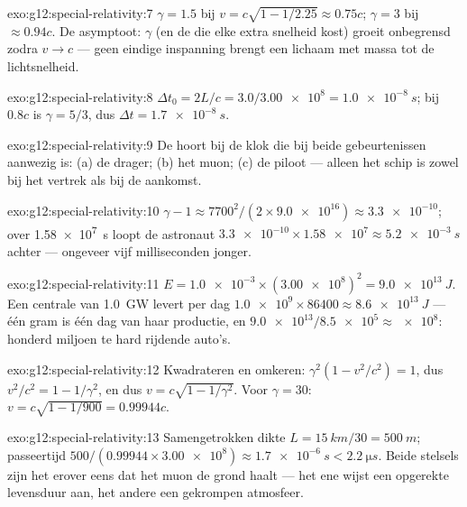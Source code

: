 \begin{solution}{exo:g12:special-relativity:7}
$\gamma = 1.5$ bij $v = c\sqrt{1 - 1/2.25} \approx 0.75c$; $\gamma = 3$ bij
$\approx 0.94c$. De asymptoot: $\gamma$ (en de  die elke extra snelheid
kost) groeit onbegrensd zodra $v \to c$ --- geen eindige inspanning brengt een
lichaam met massa tot de lichtsnelheid.
\end{solution}

\begin{solution}{exo:g12:special-relativity:8}
$\Delta t_0 = 2L/c = 3.0/\num{3.00e8} = \qty{1.0e-8}{s}$; bij $0.8c$ is
$\gamma = 5/3$, dus $\Delta t = \qty{1.7e-8}{s}$.
\end{solution}

\begin{solution}{exo:g12:special-relativity:9}
De  hoort bij de klok die bij beide gebeurtenissen aanwezig is: (a) de
drager; (b) het muon; (c) de piloot --- alleen het schip is zowel bij het
vertrek als bij de aankomst.
\end{solution}

\begin{solution}{exo:g12:special-relativity:10}
$\gamma - 1 \approx 7700^2/(2 \times \num{9.0e16}) \approx \num{3.3e-10}$; over
\qty{1.58e7}{s} loopt de astronaut $\num{3.3e-10} \times \num{1.58e7} \approx
\qty{5.2e-3}{s}$ achter --- ongeveer vijf milliseconden jonger.
\end{solution}

\begin{solution}{exo:g12:special-relativity:11}
$E = \num{1.0e-3} \times (\num{3.00e8})^2 = \qty{9.0e13}{J}$. Een centrale van
\qty{1.0}{GW} levert per dag $\num{1.0e9} \times 86400 \approx
\qty{8.6e13}{J}$ --- één gram is één dag van haar productie, en
$\num{9.0e13}/\num{8.5e5} \approx \num{e8}$: honderd miljoen te hard rijdende
auto's.
\end{solution}

\begin{solution}{exo:g12:special-relativity:12}
Kwadrateren en omkeren: $\gamma^2(1 - v^2/c^2) = 1$, dus
$v^2/c^2 = 1 - 1/\gamma^2$, en dus $v = c\sqrt{1 - 1/\gamma^2}$. Voor
$\gamma = 30$: $v = c\sqrt{1 - 1/900} = 0.99944c$.
\end{solution}

\begin{solution}{exo:g12:special-relativity:13}
Samengetrokken dikte $L = \qty{15}{km}/30 = \qty{500}{m}$; passeertijd
$500/(0.99944 \times \num{3.00e8}) \approx \qty{1.7e-6}{s} <
\qty{2.2}{\micro s}$. Beide stelsels zijn het erover eens dat het muon de grond
haalt --- het ene wijst een opgerekte levensduur aan, het andere een gekrompen
atmosfeer.
\end{solution}

